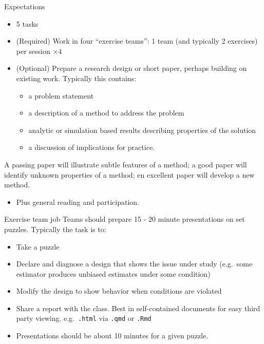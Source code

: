 \documentclass[
  11pt,
  ignorenonframetext,
]{beamer}
\providecommand{\tightlist}{%
  \setlength{\itemsep}{0pt}\setlength{\parskip}{0pt}}\usepackage{longtable,booktabs,array}
\begin{document}
\begin{frame}{Expectations}
\protect\hypertarget{expectations}{}
\begin{itemize}
\tightlist
\item
  5 tasks
\item
  (Required) Work in four ``exercise teams'': 1 team (and typically 2
  exercises) per session \(\times 4\)
\item
  (Optional) Prepare a research design or short paper, perhaps building
  on existing work. Typically this contains:

  \begin{itemize}
  \tightlist
  \item
    a problem statement
  \item
    a description of a method to address the problem
  \item
    analytic or simulation based results describing properties of the
    solution
  \item
    a discussion of implications for practice.
  \end{itemize}
\end{itemize}

A passing paper will illustrate subtle features of a method; a good
paper will identify unknown properties of a method; en excellent paper
will develop a new method.

\begin{itemize}
\tightlist
\item
  Plus general reading and participation.
\end{itemize}
\end{frame}

\begin{frame}[fragile]{Exercise team job}
\protect\hypertarget{exercise-team-job}{}
Teams should prepare 15 - 20 minute presentations on set puzzles.
Typically the task is to:

\begin{itemize}
\item
  Take a puzzle
\item
  Declare and diagnose a design that shows the issue under study
  (e.g.~some estimator produces unbiased estimates under some condition)
\item
  Modify the design to show behavior when conditions are violated
\item
  Share a report with the class. Best in self-contained documents for
  easy third party viewing. e.g.~\texttt{.html} via \texttt{.qmd} or
  \texttt{.Rmd}
\item
  Presentations should be about 10 minutes for a given puzzle.
\end{itemize}
\end{frame}
\end{document}
